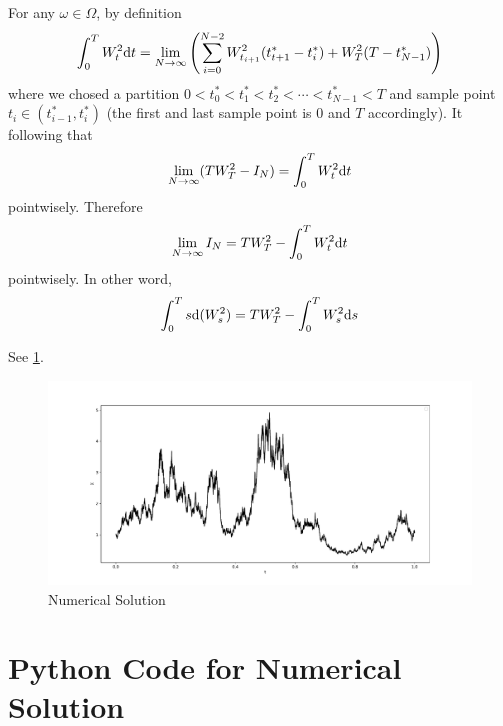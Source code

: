 \documentclass{homework}
\begin{document}
    For any $\omega\in\Omega$, by definition
    \[\int_0^TW_t^2\mathrm d t
    =\lim_{N\to\infty}\left(\sum_{i=0}^{N-2}W_{t_{i+1}}^2(t^*_{t+1}-t^*_i)
    +W_T^2(T-t_{N-1}^*)\right)\]
    where we chosed a partition
    $0<t_0^*<t_1^*<t_2^*<\cdots<t_{N-1}^*<T$ and
    sample point $t_i\in(t_{i-1}^*,t_i^*)$
    (the first and last sample point is $0$ and $T$
    accordingly).
    It following that
    \[\lim_{N\to\infty}(TW_T^2-I_N)
    =\int_0^TW_t^2\mathrm d t\]
    pointwisely.
    Therefore
    \[\lim_{N\to\infty}I_N
    =TW_T^2-\int_0^TW_t^2\mathrm d t\]
    pointwisely. In other word,
    \[\int_0^Ts\mathrm d(W_s^2)=TW_T^2-\int_0^TW_s^2\mathrm d s\]



    \problem
    See \cref{fig:numerical solution}.
    \begin{figure}[h]
        \centering
        \includegraphics[width=\linewidth]{solution}
        \caption{Numerical Solution}
        \label{fig:numerical solution}
    \end{figure}

    \appendix
    \section{Python Code for Numerical Solution}
    
\end{document}

